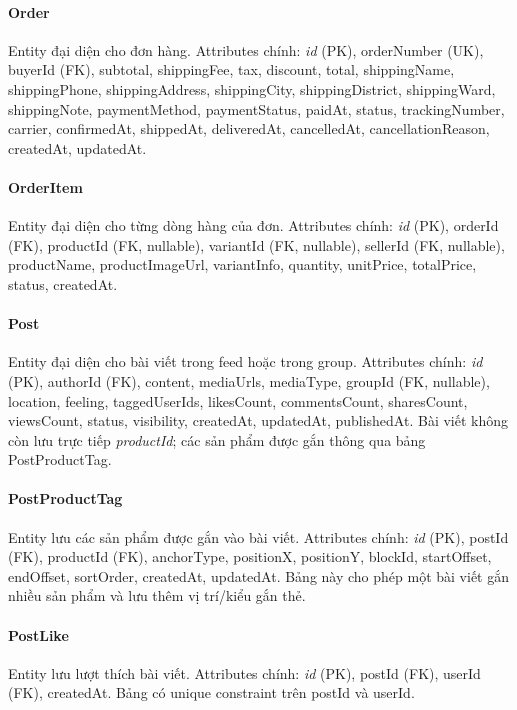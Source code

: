 \paragraph{Order} Entity đại diện cho đơn hàng. Attributes chính: \textit{id} (PK), orderNumber (UK), buyerId (FK), subtotal, shippingFee, tax, discount, total, shippingName, shippingPhone, shippingAddress, shippingCity, shippingDistrict, shippingWard, shippingNote, paymentMethod, paymentStatus, paidAt, status, trackingNumber, carrier, confirmedAt, shippedAt, deliveredAt, cancelledAt, cancellationReason, createdAt, updatedAt.

\paragraph{OrderItem} Entity đại diện cho từng dòng hàng của đơn. Attributes chính: \textit{id} (PK), orderId (FK), productId (FK, nullable), variantId (FK, nullable), sellerId (FK, nullable), productName, productImageUrl, variantInfo, quantity, unitPrice, totalPrice, status, createdAt.

\paragraph{Post} Entity đại diện cho bài viết trong feed hoặc trong group. Attributes chính: \textit{id} (PK), authorId (FK), content, mediaUrls, mediaType, groupId (FK, nullable), location, feeling, taggedUserIds, likesCount, commentsCount, sharesCount, viewsCount, status, visibility, createdAt, updatedAt, publishedAt. Bài viết không còn lưu trực tiếp \textit{productId}; các sản phẩm được gắn thông qua bảng PostProductTag.

\paragraph{PostProductTag} Entity lưu các sản phẩm được gắn vào bài viết. Attributes chính: \textit{id} (PK), postId (FK), productId (FK), anchorType, positionX, positionY, blockId, startOffset, endOffset, sortOrder, createdAt, updatedAt. Bảng này cho phép một bài viết gắn nhiều sản phẩm và lưu thêm vị trí/kiểu gắn thẻ.

\paragraph{PostLike} Entity lưu lượt thích bài viết. Attributes chính: \textit{id} (PK), postId (FK), userId (FK), createdAt. Bảng có unique constraint trên postId và userId.

